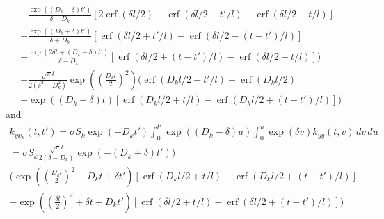 \documentclass{article}
\newcommand{\erf}{\operatorname{erf}}
\begin{document}
\begin{multline}
  +
  \frac{\exp((D_k - \delta)t')}{\delta - D_k}
  [2\erf(\delta l / 2) - \erf(\delta l / 2 - t'/l) - \erf(\delta l / 2 - t/l)] \\
  +
  \frac{\exp((D_k + \delta)t')}{\delta + D_k}
  [\erf(\delta l / 2 + t'/l) - \erf(\delta l / 2 - (t-t')/l)]\\
  +
  \frac{\exp(2\delta t + (D_k - \delta)t')}{\delta - D_k}
  [\erf(\delta l / 2 + (t-t')/l) - \erf(\delta l / 2 + t/l)]
  \bigg) \\
  + \frac{\sqrt{\pi}l}{2(\delta^2 - D_k^2)}
  \exp\left(\left(\frac{D_k l}{2}\right)^2\right)
  \bigg(
  \erf(D_k l/2 - t'/l) - \erf(D_k l/2) \\
  + \exp((D_k + \delta) t) [\erf(D_k l/2 + t/l) - \erf(D_k l/2 + (t-t')/l)]
  \bigg)
\end{multline}
and
\begin{multline}
  k_{y x_k}(t, t') = \sigma S_k \exp(-D_k t') \int_0^{t'}
  \exp((D_k - \delta) u) \int_0^u \exp(\delta v) k_{yy}(t, v)\, dv\, du \\
  = \sigma S_k \frac{\sqrt{\pi} l}{2(\delta - D_k)} \exp(-(D_k+\delta) t')) \\
  \bigg(
  \exp\left(\left(\frac{D_k l}{2}\right)^2 + D_k t + \delta t' \right)
  [\erf(D_k l / 2 + t/l) - \erf(D_k l / 2 + (t-t')/l)] \\
  -
  \exp\left(\left(\frac{\delta l}{2}\right)^2 + \delta t + D_k t'\right)
  [\erf(\delta l / 2 + t/l) - \erf(\delta l / 2 + (t-t')/l)]
  \bigg)
\end{multline}




\end{document}
